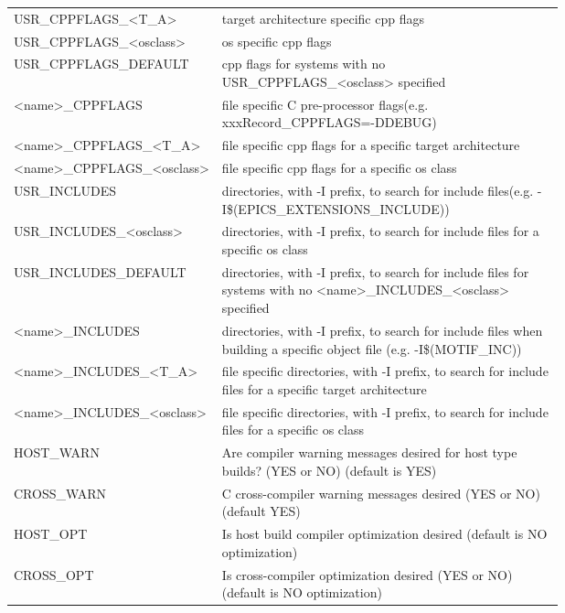 \begin{center}
\begin{longtable}{lp{0.7\linewidth}}
USR\_CPPFLAGS\_\textless{}T\_A\textgreater{} & target architecture specific cpp flags\\
USR\_CPPFLAGS\_\textless{}osclass\textgreater{} & os specific cpp flags\\
USR\_CPPFLAGS\_DEFAULT & cpp flags for systems with no USR\_CPPFLAGS\_\textless{}osclass\textgreater{} specified\\
\textless{}name\textgreater{}\_CPPFLAGS & file specific C pre-processor flags(e.g. xxxRecord\_CPPFLAGS=-DDEBUG)\\
\textless{}name\textgreater{}\_CPPFLAGS\_\textless{}T\_A\textgreater{} & file specific cpp flags for a specific target architecture\\
\textless{}name\textgreater{}\_CPPFLAGS\_\textless{}osclass\textgreater{} & file specific cpp flags for a specific os class\\
USR\_INCLUDES & directories, with -I prefix, to search for include files(e.g. -I\$(EPICS\_EXTENSIONS\_INCLUDE))\\
USR\_INCLUDES\_\textless{}osclass\textgreater{} & directories, with -I prefix, to search for include files for a specific os class\\
USR\_INCLUDES\_DEFAULT & directories, with -I prefix, to search for include files for systems with no \textless{}name\textgreater{}\_INCLUDES\_\textless{}osclass\textgreater{} specified\\
\textless{}name\textgreater{}\_INCLUDES & directories, with -I prefix, to search for include files when building a specific object file (e.g. -I\$(MOTIF\_INC))\\
\textless{}name\textgreater{}\_INCLUDES\_\textless{}T\_A\textgreater{} & file specific directories, with -I prefix, to search for include files for a specific target architecture\\
\textless{}name\textgreater{}\_INCLUDES\_\textless{}osclass\textgreater{} & file specific directories, with -I prefix, to search for include files for a specific os class\\
HOST\_WARN & Are compiler warning messages desired for host type builds? (YES or NO) (default is YES)\\
CROSS\_WARN & C cross-compiler warning messages desired (YES or NO) (default YES)\\
HOST\_OPT & Is host build compiler optimization desired (default is NO optimization)\\
CROSS\_OPT & Is cross-compiler optimization desired (YES or NO) (default is NO optimization)\\

\end{longtable}
\end{center}
